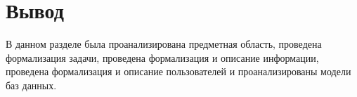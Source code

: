 \section*{Вывод}
В данном разделе была проанализирована предметная область, проведена формализация задачи, проведена формализация и описание информации, проведена формализация и описание пользователей и проанализированы модели баз данных. 

 
